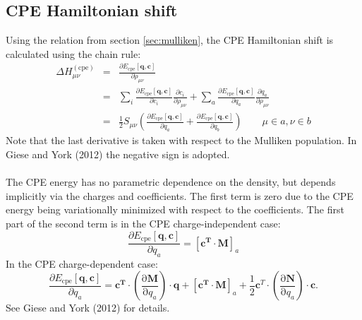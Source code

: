 \documentclass{article}
\numberwithin{equation}{section}
\begin{document}
\subsection{CPE Hamiltonian shift}
Using the relation from section \ref{sec:mulliken}, the CPE Hamiltonian shift is calculated using the chain rule:
\begin{eqnarray}
    \Delta H_{\mu\nu}^{\mathrm{(cpe)}} &=& \frac{\partial E_{\mathrm{cpe}}\left[\mathbf{q}, \mathbf{c}\right]}{\partial \rho_{\mu\nu}}\\
    &=& \sum_i \frac{\partial E_{\mathrm{cpe}}\left[\mathbf{q}, \mathbf{c}\right]}{\partial c_i} 
    \frac{\partial c_i}{\partial \rho_{\mu\nu}}
    + \sum_a \frac{\partial E_{\mathrm{cpe}}\left[\mathbf{q}, \mathbf{c}\right]}{\partial q_a} 
    \frac{\partial q_a}{\partial \rho_{\mu\nu}}\\
    &=& \frac{1}{2} S_{\mu\nu} \left(
    \frac{\partial E_{\mathrm{cpe}}\left[\mathbf{q}, \mathbf{c}\right]}{\partial q_a} +
    \frac{\partial E_{\mathrm{cpe}}\left[\mathbf{q}, \mathbf{c}\right]}{\partial q_b}
\right) \qquad \mu \in a, \nu \in b
\end{eqnarray}
Note that the last derivative is taken with respect to the Mulliken population. In Giese and York (2012) the negative sign is adopted.
\\\\The CPE energy has no parametric dependence on the density, but depends implicitly via the charges and coefficients.
The first term is zero due to the CPE energy being variationally minimized with respect to the coefficients.
The first part of the second term is in the CPE charge-independent case:
\begin{equation}
    \frac{\partial E_{\mathrm{cpe}}\left[\mathbf{q}, \mathbf{c}\right]}{\partial q_a} = [\mathbf{c^T}  \cdot \mathbf{M}]_a
\end{equation}
In the CPE charge-dependent case:
\begin{equation}
    \frac{\partial E_{\mathrm{cpe}}\left[\mathbf{q}, \mathbf{c}\right]}{\partial q_a} = 
    \mathbf{c^T} \cdot \left( \frac{\mathrm{\partial}\mathbf{M}}{\mathrm{\partial}q_a}\right) \cdot \mathbf{q} 
    + [\mathbf{c^T}  \cdot \mathbf{M}]_a + \frac{1}{2}\mathbf{c}^T \cdot \left( \frac{\mathrm{\partial}\mathbf{N}}{\mathrm{\partial}q_a}\right) \cdot \mathbf{c}. 
\end{equation}
See Giese and York (2012) for details.\cite{gieseyork2012}
\end{document}
